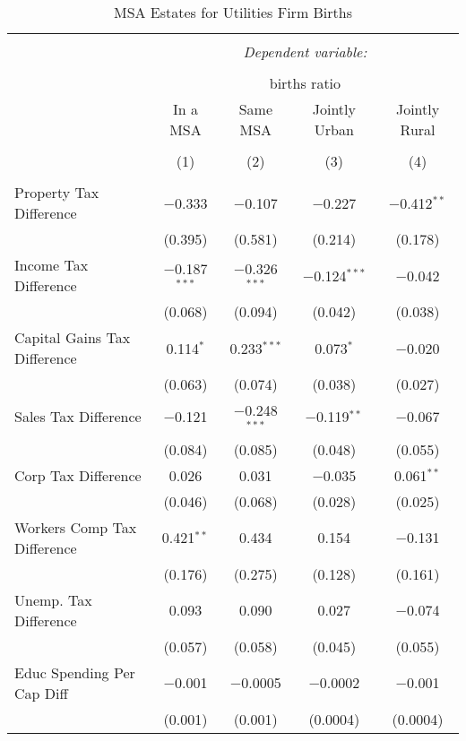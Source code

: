 
\begin{table}[!htbp] \centering 
  \caption{MSA Estates for  Utilities Firm Births} 
  \label{} 
\begin{tabular}{@{\extracolsep{5pt}}lcccc} 
\\[-1.8ex]\hline 
\hline \\[-1.8ex] 
 & \multicolumn{4}{c}{\textit{Dependent variable:}} \\ 
\cline{2-5} 
\\[-1.8ex] & \multicolumn{4}{c}{births ratio} \\ 
 & In a MSA & Same MSA & Jointly Urban & Jointly Rural \\ 
\\[-1.8ex] & (1) & (2) & (3) & (4)\\ 
\hline \\[-1.8ex] 
 Property Tax Difference & $-$0.333 & $-$0.107 & $-$0.227 & $-$0.412$^{**}$ \\ 
  & (0.395) & (0.581) & (0.214) & (0.178) \\ 
  Income Tax Difference & $-$0.187$^{***}$ & $-$0.326$^{***}$ & $-$0.124$^{***}$ & $-$0.042 \\ 
  & (0.068) & (0.094) & (0.042) & (0.038) \\ 
  Capital Gains Tax Difference & 0.114$^{*}$ & 0.233$^{***}$ & 0.073$^{*}$ & $-$0.020 \\ 
  & (0.063) & (0.074) & (0.038) & (0.027) \\ 
  Sales Tax Difference & $-$0.121 & $-$0.248$^{***}$ & $-$0.119$^{**}$ & $-$0.067 \\ 
  & (0.084) & (0.085) & (0.048) & (0.055) \\ 
  Corp Tax Difference & 0.026 & 0.031 & $-$0.035 & 0.061$^{**}$ \\ 
  & (0.046) & (0.068) & (0.028) & (0.025) \\ 
  Workers Comp Tax Difference & 0.421$^{**}$ & 0.434 & 0.154 & $-$0.131 \\ 
  & (0.176) & (0.275) & (0.128) & (0.161) \\ 
  Unemp. Tax Difference & 0.093 & 0.090 & 0.027 & $-$0.074 \\ 
  & (0.057) & (0.058) & (0.045) & (0.055) \\ 
  Educ Spending Per Cap Diff & $-$0.001 & $-$0.0005 & $-$0.0002 & $-$0.001 \\ 
  & (0.001) & (0.001) & (0.0004) & (0.0004) \\ 

\end{tabular}
\end{table}
